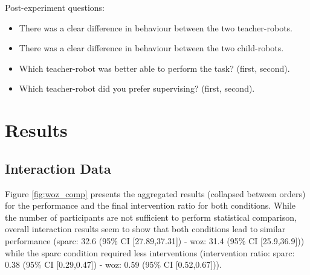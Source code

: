 Post-experiment questions:
\begin{itemize}
	\item There was a clear difference in behaviour between the two teacher-robots.
	\item There was a clear difference in behaviour between the two child-robots.
	\item Which teacher-robot was better able to perform the task? (first, second).
	\item Which teacher-robot did you prefer supervising? (first, second).
\end{itemize}

\section{Results}

\subsection{Interaction Data}

Figure \ref{fig:woz_comp} presents the aggregated results (collapsed between orders) for the performance and the final intervention ratio for both conditions. While the number of participants are not sufficient to perform statistical comparison, overall interaction results seem to show that both conditions lead to similar performance (\gls{sparc}: 32.6 (95\% CI [27.89,37.31]) - \gls{woz}: 31.4 (95\% CI [25.9,36.9])) while the \gls{sparc} condition required less interventions (intervention ratio: \gls{sparc}: 0.38 (95\% CI [0.29,0.47]) - \gls{woz}: 0.59 (95\% CI [0.52,0.67])). 


